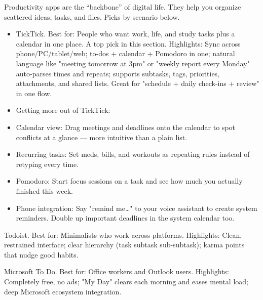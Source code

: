 


Productivity apps are the “backbone” of digital life. They help you organize scattered ideas, tasks, and files. Picks by scenario below.


\begin{itemize}
  \item TickTick. Best for: People who want work, life, and study tasks plus a calendar in one place. A top pick in this section. Highlights: Sync across phone/PC/tablet/web; to-dos + calendar + Pomodoro in one; natural language like "meeting tomorrow at 3pm" or "weekly report every Monday" auto-parses times and repeats; supports subtasks, tags, priorities, attachments, and shared lists. Great for "schedule + daily check-ins + review" in one flow.
  \item Getting more out of TickTick:
  \item Calendar view: Drag meetings and deadlines onto the calendar to spot conflicts at a glance — more intuitive than a plain list.
  \item Recurring tasks: Set meds, bills, and workouts as repeating rules instead of retyping every time.
  \item Pomodoro: Start focus sessions on a task and see how much you actually finished this week.
  \item Phone integration: Say "remind me…" to your voice assistant to create system reminders. Double up important deadlines in the system calendar too.
\end{itemize}

Todoist. Best for: Minimalists who work across platforms. Highlights: Clean, restrained interface; clear hierarchy (task subtask sub-subtask); karma points that nudge good habits.

Microsoft To Do. Best for: Office workers and Outlook users. Highlights: Completely free, no ads; "My Day" clears each morning and eases mental load; deep Microsoft ecosystem integration.

